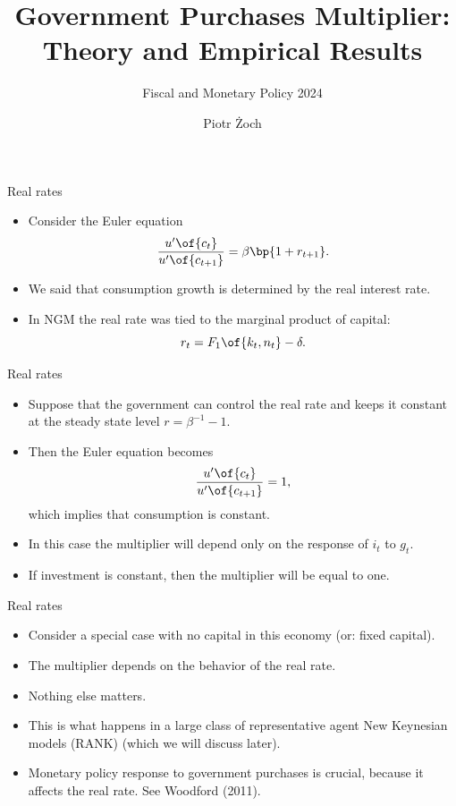 \documentclass[11pt,xcolor={dvipsnames},aspectratio=159,hyperref={pdftex,pdfpagemode=UseNone,hidelinks,pdfdisplaydoctitle=true},usepdftitle=false]{beamer}
\begin{document}
\title{Government Purchases Multiplier: Theory and Empirical Results}
\subtitle{Fiscal and Monetary Policy 2024}

\author{Piotr Żoch}%
\frame{\titlepage}


\begin{frame}
\end{frame}

\begin{frame}{Real rates}
    \begin{itemize}
    \item Consider the Euler equation 
\begin{align*}
    \frac{u'\of{c_t}}{u'\of{c_{t+1}}} = \beta\bp{1 + r_{t+1}}.
\end{align*}
\item We said that consumption growth is determined by the real interest rate.
\item In NGM the real rate was tied to the marginal product of capital: $$r_t = F_1\of{k_t,n_t} - \delta.$$ 
\end{itemize}
\end{frame}

\begin{frame}{Real rates}
    \begin{itemize}
    \item Suppose that the government can  control the real rate and keeps it constant at the steady state level $r=\beta^{-1}-1$.
    \item Then the Euler equation becomes \begin{align*}
        \frac{u'\of{c_t}}{u'\of{c_{t+1}}} = 1,
    \end{align*}
    which implies that consumption is constant.
    \item In this case the multiplier will depend only on the response of $i_t$ to $g_t$. 
    \item If investment is constant, then the multiplier will be equal to one.
\end{itemize}
\end{frame}      

\begin{frame}{Real rates}
    \begin{itemize}
    \item Consider a special case with no capital in this economy (or: fixed capital). 
    \item The multiplier depends  on the behavior of the real rate.
    \item Nothing else matters. 
    \item This is what happens in a large class of representative agent New Keynesian models (RANK) (which we will discuss later). 
    \item Monetary policy response to government purchases is crucial, because it affects the real rate. See Woodford (2011). 
    \end{itemize}
\end{frame}
\end{document}
